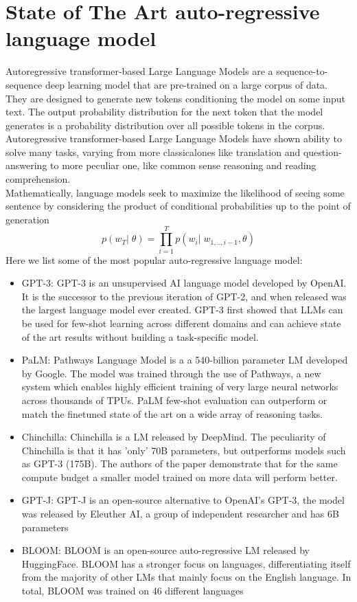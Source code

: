 \section{State of The Art auto-regressive language model}
Autoregressive transformer-based Large Language Models are a sequence-to-sequence deep learning model that are pre-trained on a large corpus of data. They are designed to generate new tokens conditioning the model on some input text. The output probability distribution for the next token that the model generates is a probability distribution over all possible tokens in the corpus. \\
Autoregressive transformer-based Large Language Models have shown ability to solve many tasks\cite{gpt3}, varying from more classicalones like translation and question-answering to more peculiar one, like common sense reasoning and reading comprehension. \\
Mathematically, language models seek to maximize the likelihood of seeing some sentence by considering the product of conditional probabilities up to the point of generation
\begin{equation}
    p(w_T|\;\theta) = \prod_{i=1}^{T}p(w_i|\;w_{1,..,i-1}, \theta)
\end{equation}
Here we list some of the most popular auto-regressive language model:
\begin{itemize}
    \item GPT-3: GPT-3 is an unsupervised AI language model developed by OpenAI. It is the successor to the previous iteration of GPT-2, and when released was the largest language model ever created. GPT-3 first showed that LLMs can be used for few-shot learning across different domains and can achieve state of the art results without  building a task-specific model.
    \item PaLM: Pathways Language Model is a a 540-billion parameter LM developed by Google. The model was trained through the use of Pathways, a new system which enables highly efficient training of very large neural networks across thousands of TPUs. PaLM few-shot evaluation can outperform or match the finetuned state of the art on a wide array of reasoning tasks.
    \item Chinchilla: Chinchilla is a LM released by DeepMind. The peculiarity of Chinchilla is that it has 'only' 70B parameters, but outperforms models such as GPT-3 (175B). The authors of the paper demonstrate that for the same compute budget a smaller model trained on more data will perform better.
    \item GPT-J: GPT-J is an open-source alternative to OpenAI's GPT-3, the model was released by Eleuther AI, a group of independent researcher and has 6B parameters
    \item BLOOM: BLOOM is an open-source auto-regressive LM released by HuggingFace. BLOOM has a stronger focus on languages, differentiating itself from the majority of other LMs that mainly focus on the English language. In total, BLOOM was trained on 46 different languages
\end{itemize}
